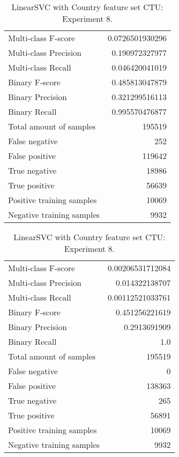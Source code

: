 \begin{table}[H]
\begin{minipage}{0.5\textwidth}
\caption{LinearSVC with Country feature set CTU: Experiment 7.}
\centering
\begin{tabular}{l r}
\toprule
Multi-class F-score & 0.0726501930296 \\
Multi-class Precision & 0.190972327977 \\
Multi-class Recall & 0.046420041019 \\
\midrule
Binary F-score & 0.485813047879 \\
Binary Precision & 0.321299516113 \\
Binary Recall & 0.995570476877 \\
\midrule
Total amount of samples & 195519 \\
False negative & 252 \\
False positive & 119642 \\
True negative & 18986 \\
True positive & 56639 \\
\midrule
Positive training samples & 10069 \\
Negative training samples & 9932 \\
\bottomrule
\end{tabular}
\end{minipage}
\hfillx
\begin{minipage}{0.5\textwidth}
\caption{LinearSVC with Country feature set CTU: Experiment 8.}
\centering
\begin{tabular}{l r}
\toprule
Multi-class F-score & 0.00206531712084 \\
Multi-class Precision & 0.014322138707 \\
Multi-class Recall & 0.00112521033761 \\
\midrule
Binary F-score & 0.451256221619 \\
Binary Precision & 0.2913691909 \\
Binary Recall & 1.0 \\
\midrule
Total amount of samples & 195519 \\
False negative & 0 \\
False positive & 138363 \\
True negative & 265 \\
True positive & 56891 \\
\midrule
Positive training samples & 10069 \\
Negative training samples & 9932 \\
\bottomrule
\end{tabular}
\end{minipage}
\end{table}
